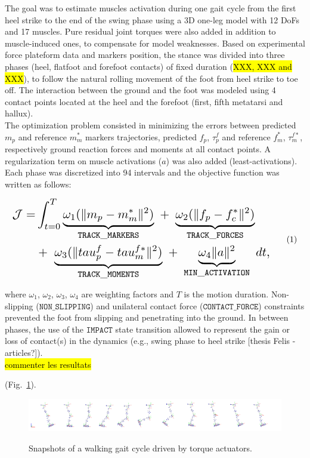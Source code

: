 The goal was to estimate muscles activation during one gait cycle from the first heel strike to the end of the swing phase using a 3D one-leg model with 12 DoFs and 17 muscles. 
Pure residual joint torques were also added in addition to muscle-induced ones, to compensate for model weaknesses.
Based on experimental force plateform data and markers position, the stance was divided into three phases (heel, flatfoot and forefoot contacts) of fixed duration (\hl{XXX, XXX and XXX}), to follow the natural rolling movement of the foot from heel strike to toe off.
The interaction between the ground and the foot was modeled using 4 contact points located at the heel and the forefoot (first, fifth metatarsi and hallux).\\ 
The optimization problem consisted in minimizing the errors between predicted $m_p$ and reference $m_m^*$ markers trajectories, predicted $f_p$, $\tau^f_p$ and reference $f_m^*$, $\tau^{f*}_m$, respectively ground reaction forces and moments at all contact points.
A regularization term on muscle activations ($a$) was also added (least-activations).
Each phase was discretized into 94 intervals and the objective function was written as follows:

\[ 
\resizebox{0.9\columnwidth}{!}{$ 
\begin{aligned}
\mathcal{J} = &\int_{t=0}^{T}\underbrace{\omega_1(\|m_p - m^*_m\|^{2})}_{\mathtt{TRACK\_MARKERS}}~ 
+ ~ \underbrace{\omega_2(\|f_p - f^*_c\|^{2})}_{\mathtt{TRACK\_FORCES}}\\
&+ ~ \underbrace{\omega_3(\|tau^f_p - tau^{f*}_m\|^{2})}_{\mathtt{TRACK\_MOMENTS}}~
+ ~ \underbrace{\omega_4\|a\|^2}_{\mathtt{MIN\_ACTIVATION}}~dt, 
\end{aligned}  
$}
\addtag  
\label{eq:ocp_walk}  
\]  

where $\omega_1$, $\omega_2$, $\omega_3$, $\omega_4$ are weighting factors and $T$ is the motion duration.
Non-slipping ($\mathtt{NON\_SLIPPING}$) and unilateral contact force ($\mathtt{CONTACT\_FORCE}$) constraints prevented the foot from slipping and penetrating into the ground. 
In between phases, the use of the $\mathtt{IMPACT}$ state transition allowed to represent the gain or loss of contact(s) in the dynamics (e.g., swing phase to heel strike [thesis Felis - articles?]).\\

\hl{commenter les resultats}

(Fig.~\ref{fig:snapshots_multiphase_walking_cycle}). 

\begin{figure}[t!]
\centering
\includegraphics[width=\textwidth]{figures/multiphase_walking_cycle.png}\\
\caption{Snapshots of a walking gait cycle driven by torque actuators.}
\label{fig:snapshots_multiphase_walking_cycle}
\end{figure}

